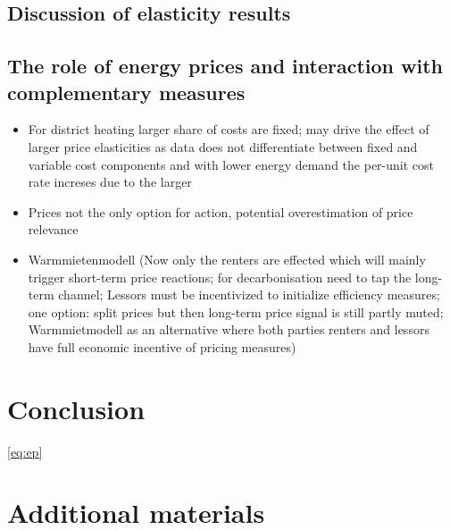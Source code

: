 \documentclass[12pt,twoside]{reedthesis}
\begin{document}
\hypertarget{discussion-of-elasticity-results}{%
\section{Discussion of elasticity results}\label{discussion-of-elasticity-results}}

\hypertarget{the-role-of-energy-prices-and-interaction-with-complementary-measures}{%
\section{The role of energy prices and interaction with complementary measures}\label{the-role-of-energy-prices-and-interaction-with-complementary-measures}}
\begin{itemize}
\item
  For district heating larger share of costs are fixed; may drive the effect of larger price elasticities as data does not differentiate between fixed and variable cost components and with lower energy demand the per-unit cost rate increses due to the larger
\item
  Prices not the only option for action, potential overestimation of price relevance
\item
  Warmmietenmodell (Now only the renters are effected which will mainly trigger short-term price reactions; for decarbonisation need to tap the long-term channel; Lessors must be incentivized to initialize efficiency measures; one option: split prices but then long-term price signal is still partly muted; Warmmietmodell as an alternative where both parties renters and lessors have full economic incentive of pricing measures)
\end{itemize}
\hypertarget{conclusion}{%
\chapter{Conclusion}\label{conclusion}}

\eqref{eq:ep}

\appendix

\hypertarget{additional-materials}{%
\chapter{Additional materials}\label{additional-materials}}
\end{document}
